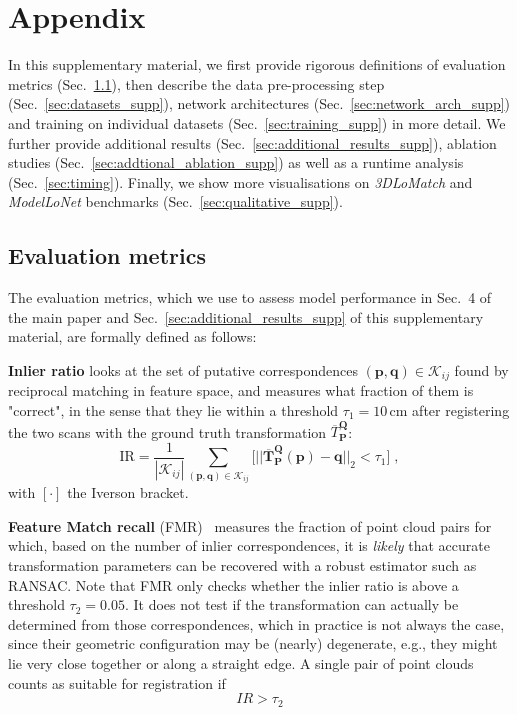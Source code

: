 \section{Appendix}
In this supplementary material, we first provide rigorous definitions of evaluation metrics (Sec.~\ref{sec:evaluation_metrics_supp}), then describe the data pre-processing step (Sec.~\ref{sec:datasets_supp}), network architectures (Sec.~\ref{sec:network_arch_supp}) and training on individual datasets (Sec.~\ref{sec:training_supp}) in more detail. We further provide additional results (Sec.~\ref{sec:additional_results_supp}), ablation studies (Sec.~\ref{sec:addtional_ablation_supp}) as well as a runtime analysis (Sec.~\ref{sec:timing}). Finally, we show more visualisations on \emph{3DLoMatch} and \emph{ModelLoNet} benchmarks (Sec.~\ref{sec:qualitative_supp}). 


\subsection{Evaluation metrics}
\label{sec:evaluation_metrics_supp}
The evaluation metrics, which we use to assess model performance in Sec.~4 of the main paper and Sec.~\ref{sec:additional_results_supp} of this supplementary material, are formally defined as follows:

\textbf{Inlier ratio} looks at the set of putative correspondences $(\mathbf{p}, \mathbf{q}) \in \mathcal{K}_{i j}$ found by reciprocal matching%
in feature space, and measures what fraction of them is "correct", in the sense that they lie within a threshold $\tau_1\!=\!10\,$cm after registering the two scans with the ground truth transformation $\overbar{T}_\mathbf{P}^ \mathbf{Q}$:
\begin{equation}
\mathrm{IR} = \frac{1}{\left|\mathcal{K}_{ij}\right|} \sum_{\left(\mathbf{p}, \mathbf{q}\right) \in \mathcal{K}_{ij}} \big[ ||\overbar{\mathbf{T}}_\mathbf{P}^ \mathbf{Q}(\mathbf{p})-\mathbf{q}||_2<\tau_{1} \big]  \;,
\end{equation}
with $[\cdot]$ the Iverson bracket.

\textbf{Feature Match recall} (FMR)~\cite{deng2018ppfnet} measures the fraction of point cloud pairs for which, based on the number of inlier correspondences, it is \emph{likely} that accurate transformation parameters can be recovered with a robust estimator such as RANSAC.
Note that FMR only checks whether the inlier ratio is above a threshold $\tau_2=0.05$. It does not test if the transformation can actually be determined from those correspondences, which in practice is not always the case, since their geometric configuration may be (nearly) degenerate, e.g., they might lie very close together or along a straight edge.
A single pair of point clouds counts as suitable for registration if%
\begin{equation}
    IR > \tau_2
\end{equation}

